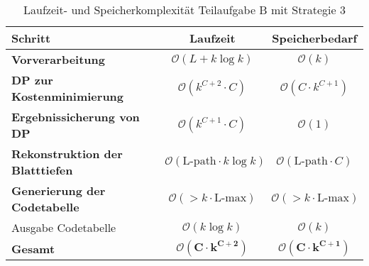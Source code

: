 \documentclass[a4paper,10pt,ngerman]{scrartcl}
\begin{document}
\begin{table}[H]
\centering
\begin{tabular}{|l|c|c|}
\hline
\textbf{Schritt} & \textbf{Laufzeit} & \textbf{Speicherbedarf} \\
\hline
\textbf{Vorverarbeitung} & $\mathcal{O}(L + k \log k)$ & $\mathcal{O}(k)$ \\
\textbf{DP zur Kostenminimierung} & $\mathcal{O}(k^{C+2}\cdot C)$ & $\mathcal{O}(C \cdot k^{C+1})$ \\
\textbf{Ergebnissicherung von DP} & $\mathcal{O}(k^{C+1}\cdot C)$ & $\mathcal{O}(1)$ \\
\textbf{Rekonstruktion der Blatttiefen} & $\mathcal{O}(\text{L-path} \cdot k \log k)$ & $\mathcal{O}(\text{L-path} \cdot C)$ \\
\textbf{Generierung der Codetabelle} & $\mathcal{O}(>k\cdot \text{L-max})$ & $\mathcal{O}(>k\cdot \text{L-max})$ \\
Ausgabe Codetabelle & $\mathcal{O}(k \log k)$ & $\mathcal{O}(k)$ \\
\hline
\textbf{Gesamt} & $\boldsymbol{\mathcal{O}(C\cdot k^{C+2})}$ & $\boldsymbol{\mathcal{O}(C\cdot k^{C+1})}$ \\
\hline
\end{tabular}
\caption{Laufzeit- und Speicherkomplexität Teilaufgabe B mit Strategie 3}
\end{table}
\end{document}
